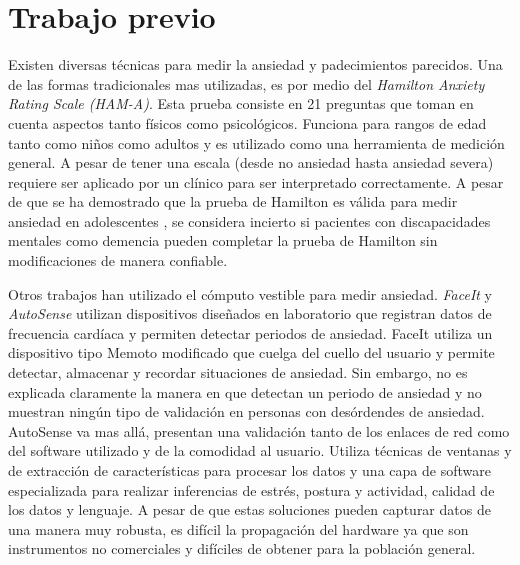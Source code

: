\documentclass[letterpaper,12pt]{cicese}
\begin{document}
		\chapter{Trabajo previo}
				Existen diversas t\'ecnicas para medir la ansiedad y padecimientos parecidos. Una de las formas tradicionales mas utilizadas, es por medio del \emph{Hamilton Anxiety Rating Scale (HAM-A)}\citep{Hamilton1959}. Esta prueba consiste en 21 preguntas que toman en cuenta aspectos tanto f\'isicos como psicol\'ogicos. Funciona para rangos de edad tanto como ni\~nos como adultos y es utilizado como una herramienta de medici\'on general. A pesar de tener una escala (desde no ansiedad hasta ansiedad severa)  requiere ser aplicado por un cl\'inico para ser interpretado correctamente. A pesar de que se ha demostrado que la prueba de Hamilton es v\'alida para medir ansiedad en adolescentes \citep{CLARK1994354}, se considera incierto si pacientes con discapacidades mentales como demencia pueden completar la prueba de Hamilton sin modificaciones de manera confiable\citep{Bradford2013125}.

				Otros trabajos han utilizado el c\'omputo vestible para medir ansiedad. {\emph{FaceIt}\citep{Rennert2013}} y {\emph{AutoSense}\citep{Ertin2011}} utilizan dispositivos dise\~nados en laboratorio que registran datos de frecuencia card\'iaca y permiten detectar periodos de ansiedad. FaceIt utiliza un dispositivo tipo Memoto modificado que cuelga del cuello del usuario y permite detectar, almacenar y recordar situaciones de ansiedad. Sin embargo, no es explicada claramente la manera en que detectan un periodo de ansiedad y no muestran ning\'un tipo de validaci\'on en personas con des\'ordendes de ansiedad. AutoSense va mas all\'a, presentan una validaci\'on tanto de los enlaces de red como del software utilizado y de la comodidad al usuario. Utiliza t\'ecnicas de ventanas y de extracci\'on de caracter\'isticas para procesar los datos y una capa de software especializada para realizar inferencias de estr\'es, postura y actividad, calidad de los datos y lenguaje. A pesar de que estas soluciones pueden capturar datos de una manera muy robusta, es dif\'icil la propagaci\'on del hardware ya que son instrumentos no comerciales y dif\'iciles de obtener para la poblaci\'on general.
\end{document}
